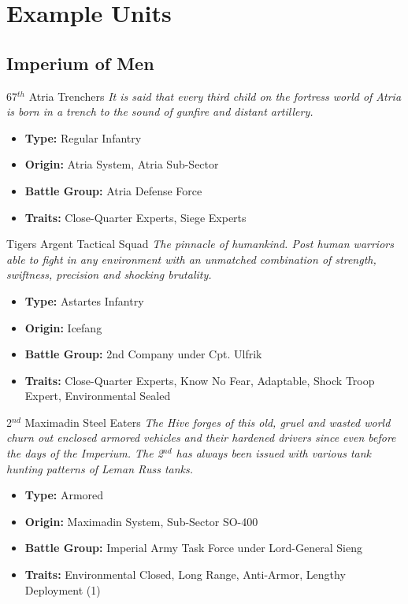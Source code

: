 \chapter{Example Units}
\section{Imperium of Men}
\begin{DndSidebar}{67$^{th}$ Atria Trenchers}
\textit{It is said that every third child on the fortress world of Atria is born in a trench to the sound of gunfire and distant artillery.}
\begin{itemize}
	\item \textbf{Type:} Regular Infantry
	\item \textbf{Origin:} Atria System, Atria Sub-Sector
	\item \textbf{Battle Group:} Atria Defense Force 
	\item \textbf{Traits:} Close-Quarter Experts, Siege Experts
\end{itemize}
\end{DndSidebar}

\begin{DndSidebar}{Tigers Argent Tactical Squad}
\textit{The pinnacle of humankind. Post human warriors able to fight in any environment with an unmatched combination of strength, swiftness, precision and shocking brutality.}
\begin{itemize}
	\item \textbf{Type:} Astartes Infantry
	\item \textbf{Origin:} Icefang
	\item \textbf{Battle Group:} 2nd Company under Cpt. Ulfrik 
	\item \textbf{Traits:} Close-Quarter Experts, Know No Fear, Adaptable, Shock Troop Expert, Environmental Sealed
\end{itemize}
\end{DndSidebar}

\begin{DndSidebar}{2$^{nd}$ Maximadin Steel Eaters}
\textit{The Hive forges of this old, gruel and wasted world churn out enclosed armored vehicles and their hardened drivers since even before the days of the Imperium. The 2$^{nd}$ has always been issued with various tank hunting patterns of Leman Russ tanks.}
\begin{itemize}
	\item \textbf{Type:} Armored
	\item \textbf{Origin:} Maximadin System, Sub-Sector SO-400
	\item \textbf{Battle Group:} Imperial Army Task Force under Lord-General Sieng
	\item \textbf{Traits:} Environmental Closed, Long Range, Anti-Armor, Lengthy Deployment (1)
\end{itemize}
\end{DndSidebar}

